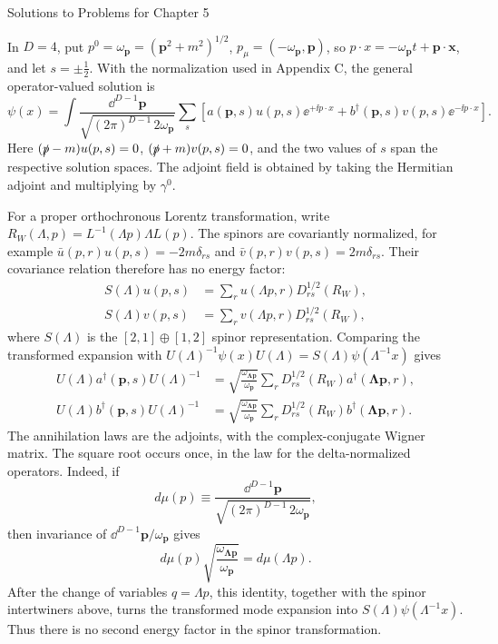\begin{bankssolutions}{Solutions to Problems for Chapter 5}

In $D=4$, put $p^0=\omega_{\mathbf p}=(\mathbf p^2+m^2)^{1/2}$, $p_\mu=(-\omega_{\mathbf p},\mathbf p)$,
so $p\cdot x=-\omega_{\mathbf p}t+\mathbf p\cdot\mathbf x$,
and let $s=\pm\frac12$. With the
normalization used in Appendix C, the general operator-valued solution is
\begin{equation*}
  \psi(x)=\int\frac{\dd^{D-1}\mathbf p}{\sqrt{(2\pi)^{D-1}\,2\omega_{\mathbf p}}}
  \sum_s\left[a(\mathbf p,s)u(p,s)\ee^{+\ii p\cdot x}
  +b^\dagger(\mathbf p,s)v(p,s)\ee^{-\ii p\cdot x}\right].
\end{equation*}
Here $(\slashed p-m)u(p,s)=0$, $(\slashed p+m)v(p,s)=0$, and the two values of
$s$ span the respective solution spaces. The adjoint field is obtained by taking
the Hermitian adjoint and multiplying by $\gamma^0$.

For a proper orthochronous Lorentz transformation, write
$R_W(\Lambda,p)=L^{-1}(\Lambda p)\Lambda L(p)$. The spinors are covariantly
normalized, for example
$\bar u(p,r)u(p,s)=-2m\delta_{rs}$ and
$\bar v(p,r)v(p,s)=2m\delta_{rs}$. Their covariance relation therefore has
no energy factor:
\begin{align*}
  S(\Lambda)u(p,s)&=
    \sum_r u(\Lambda p,r)D^{1/2}_{rs}(R_W),\\
  S(\Lambda)v(p,s)&=
    \sum_r v(\Lambda p,r)D^{1/2}_{rs}(R_W),
\end{align*}
where $S(\Lambda)$ is the $[2,1]\oplus[1,2]$ spinor representation. Comparing
the transformed expansion with
$U(\Lambda)^{-1}\psi(x)U(\Lambda)=S(\Lambda)\psi(\Lambda^{-1}x)$ gives
\begin{align*}
  U(\Lambda)a^\dagger(\mathbf p,s)U(\Lambda)^{-1}
  &=\sqrt{\frac{\omega_{\boldsymbol{\Lambda p}}}{\omega_{\mathbf p}}}
   \sum_rD^{1/2}_{rs}(R_W)a^\dagger(\boldsymbol{\Lambda p},r),\\
 U(\Lambda)b^\dagger(\mathbf p,s)U(\Lambda)^{-1}
  &=\sqrt{\frac{\omega_{\boldsymbol{\Lambda p}}}{\omega_{\mathbf p}}}
   \sum_rD^{1/2}_{rs}(R_W)b^\dagger(\boldsymbol{\Lambda p},r).
\end{align*}
The annihilation laws are the adjoints, with the complex-conjugate Wigner
matrix. The square root occurs once, in the law for the delta-normalized
operators. Indeed, if
\begin{equation*}
  d\mu(p)\equiv\frac{\dd^{D-1}\mathbf p}{\sqrt{(2\pi)^{D-1}\,2\omega_{\mathbf p}}},
\end{equation*}
then invariance of $\dd^{D-1}\mathbf p/\omega_{\mathbf p}$ gives
\begin{equation*}
  d\mu(p)\sqrt{\frac{\omega_{\boldsymbol{\Lambda p}}}{\omega_{\mathbf p}}}
  =d\mu(\Lambda p).
\end{equation*}
After the change of variables $q=\Lambda p$, this identity, together with
the spinor intertwiners above, turns the transformed mode expansion into
$S(\Lambda)\psi(\Lambda^{-1}x)$. Thus there is no second energy factor in the
spinor transformation.


\end{bankssolutions}
